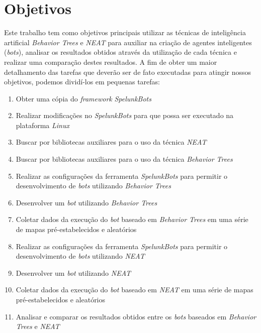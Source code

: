 \chapter{\label{chap:objectives}Objetivos}
Este trabalho tem como objetivos principais utilizar as técnicas de inteligência
artificial \textit{Behavior Trees} e \textit{NEAT} para auxiliar na criação de
agentes inteligentes (\textit{bots}), analisar os resultados obtidos através da
utilização de cada técnica e realizar uma comparação destes resultados. A fim de
obter um maior detalhamento das tarefas que deverão ser de fato executadas para
atingir nossos objetivos, podemos dividí-los em pequenas tarefas:

\begin{enumerate}
	\item
		Obter uma cópia do \textit{framework} \textit{SpelunkBots}
	\item
		Realizar modificações no \textit{SpelunkBots} para que possa ser
		executado na plataforma \textit{Linux}
	\item
		Buscar por bibliotecas auxiliares para o uso da técnica \textit{NEAT}
	\item
		Buscar por bibliotecas auxiliares para o uso da técnica \textit{Behavior
		Trees}
	\item
		Realizar as configurações da ferramenta \textit{SpelunkBots} para
		permitir o desenvolvimento de \textit{bots} utilizando \textit{Behavior
		Trees}
	\item
		Desenvolver um \textit{bot} utilizando \textit{Behavior Trees}
	\item
		Coletar dados da execução do \textit{bot} baseado em \textit{Behavior
		Trees} em uma série de mapas pré-estabelecidos e aleatórios
	\item
		Realizar as configurações da ferramenta \textit{SpelunkBots} para
		permitir o desenvolvimento de \textit{bots} utilizando \textit{NEAT}
	\item
		Desenvolver um \textit{bot} utilizando \textit{NEAT}
	\item
		Coletar dados da execução do \textit{bot} baseado em \textit{NEAT} em
		uma série de mapas pré-estabelecidos e aleatórios
	\item
		Analisar e comparar os resultados obtidos entre os \textit{bots}
		baseados em \textit{Behavior Trees} e \textit{NEAT}
\end{enumerate}
